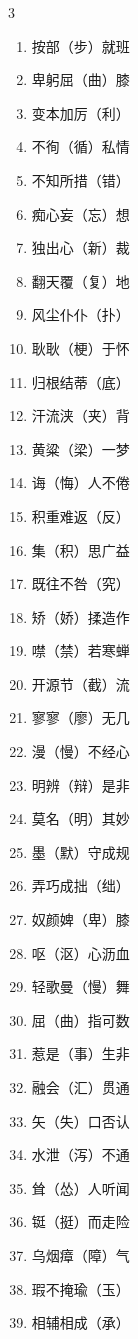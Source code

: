 \documentclass[final,oneside]{ctexbook}
\begin{document}
\begin{multicols}{3}
  \begin{enumerate}
    \item 按部（步）就班
    \item 卑躬屈（曲）膝
    \item 变本加厉（利）
    \item 不徇（循）私情
    \item 不知所措（错）
    \item 痴心妄（忘）想
    \item 独出心（新）裁
    \item 翻天覆（复）地
    \item 风尘仆仆（扑）
    \item 耿耿（梗）于怀
    \item 归根结蒂（底）
    \item 汗流浃（夹）背
    \item 黄粱（梁）一梦
    \item 诲（悔）人不倦
    \item 积重难返（反）
    \item 集（积）思广益
    \item 既往不咎（究）
    \item 矫（娇）揉造作
    \item 噤（禁）若寒蝉
    \item 开源节（截）流
    \item 寥寥（廖）无几
    \item 漫（慢）不经心
    \item 明辨（辩）是非
    \item 莫名（明）其妙
    \item 墨（默）守成规
    \item 弄巧成拙（绌）
    \item 奴颜婢（卑）膝
    \item 呕（沤）心沥血
    \item 轻歌曼（慢）舞
    \item 屈（曲）指可数
    \item 惹是（事）生非
    \item 融会（汇）贯通
    \item 矢（失）口否认
    \item 水泄（泻）不通
    \item 耸（怂）人听闻
    \item 铤（挺）而走险
    \item 乌烟瘴（障）气
    \item 瑕不掩瑜（玉）
    \item 相辅相成（承）

\end{enumerate}
\end{multicols}
\end{document}
